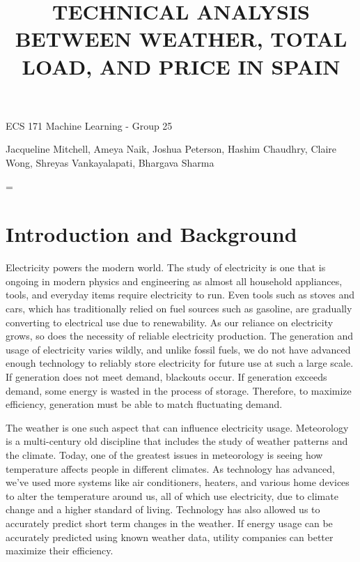 \documentclass[10pt]{article}
\title{\renewcommand{\baselinestretch}{1.17}\normalsize\bf%
\uppercase{Technical Analysis Between Weather, Total Load, and Price in Spain}
}
\begin{document}
\date{}
\maketitle

\vspace{-0.5cm}

\begin{center}
{\footnotesize 
ECS 171 Machine Learning - Group 25
}
\end{center}

\begin{center}
{\footnotesize 
Jacqueline Mitchell, Ameya Naik, Joshua Peterson, Hashim Chaudhry, Claire Wong, Shreyas Vankayalapati, Bhargava Sharma
}
\end{center}
\bigskip
\noindent


\baselineskip=\normalbaselineskip

\section{Introduction and Background}\label{sec:1}

Electricity powers the modern world. The study of electricity is one that is ongoing in modern physics and engineering as almost all household appliances, tools, and everyday items require electricity to run. Even tools such as stoves and cars, which has traditionally relied on fuel sources such as gasoline, are gradually converting to electrical use due to renewability. As our reliance on electricity grows, so does the necessity of reliable electricity production. The generation and usage of electricity varies wildly, and unlike fossil fuels, we do not have advanced enough technology to reliably store electricity for future use at such a large scale. If generation does not meet demand, blackouts occur. If generation exceeds demand, some energy is wasted in the process of storage. Therefore, to maximize efficiency, generation must be able to match fluctuating demand. 

The weather is one such aspect that can influence electricity usage. Meteorology is a multi-century old discipline that includes the study of weather patterns and the climate. Today, one of the greatest issues in meteorology is seeing how temperature affects people in different climates. As technology has advanced, we've used more systems like air conditioners, heaters, and various home devices to alter the temperature around us, all of which use electricity, due to climate change and a higher standard of living. Technology has also allowed us to accurately predict short term changes in the weather. If energy usage can be accurately predicted using known weather data, utility companies can better maximize their efficiency. 
\end{document}
